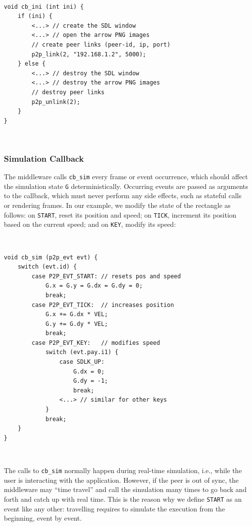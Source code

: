 \documentclass[sn-mathphys,iicol]{sn-jnl}%
\newcommand{\code}[1]  {\texttt{\small{#1}}}
\begin{document}
{\footnotesize
~
\begin{verbatim}
void cb_ini (int ini) {
    if (ini) {
        <...> // create the SDL window
        <...> // open the arrow PNG images
        // create peer links (peer-id, ip, port)
        p2p_link(2, "192.168.1.2", 5000);
    } else {
        <...> // destroy the SDL window
        <...> // destroy the arrow PNG images
        // destroy peer links
        p2p_unlink(2);
    }
}
\end{verbatim}
~
}

\subsubsection{Simulation Callback}
\label{sec.tml.api.cb_sim}

The middleware calls \code{cb\_sim} every frame or event occurrence, which
should affect the simulation state \code{G} deterministically.
Occurring events are passed as arguments to the callback, which must never
perform any side effects, such as stateful calls or rendering frames.
In our example, we modify the state of the rectangle as follows:
    on \code{START}, reset its position and speed;
    on \code{TICK},  increment its position based on the current speed; and
    on \code{KEY},   modify its speed:

{\footnotesize
~
\begin{verbatim}
void cb_sim (p2p_evt evt) {
    switch (evt.id) {
        case P2P_EVT_START: // resets pos and speed
            G.x = G.y = G.dx = G.dy = 0;
            break;
        case P2P_EVT_TICK:  // increases position
            G.x += G.dx * VEL;
            G.y += G.dy * VEL;
            break;
        case P2P_EVT_KEY:   // modifies speed
            switch (evt.pay.i1) {
                case SDLK_UP:
                    G.dx = 0;
                    G.dy = -1;
                    break;
                <...> // similar for other keys
            }
            break;
    }
}
\end{verbatim}
~
}

The calls to \code{cb\_sim} normally happen during real-time simulation, i.e.,
while the user is interacting with the application.
However, if the peer is out of sync, the middleware may ``time travel'' and
call the simulation many times to go back and forth and catch up with real
time.
This is the reason why we define \code{START} as an event like any other:
travelling requires to simulate the execution from the beginning, event by
event.
\end{document}

